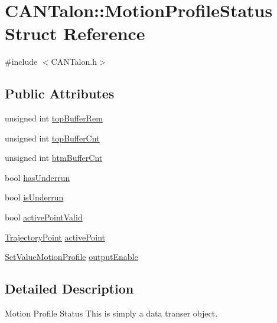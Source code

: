 \hypertarget{struct_c_a_n_talon_1_1_motion_profile_status}{}\section{C\+A\+N\+Talon\+:\+:Motion\+Profile\+Status Struct Reference}
\label{struct_c_a_n_talon_1_1_motion_profile_status}


{\ttfamily \#include $<$C\+A\+N\+Talon.\+h$>$}

\subsection*{Public Attributes}
\begin{DoxyCompactItemize}
\item 
unsigned int \hyperlink{struct_c_a_n_talon_1_1_motion_profile_status_a1042c720d455cede10218449f64946fa}{top\+Buffer\+Rem}
\item 
unsigned int \hyperlink{struct_c_a_n_talon_1_1_motion_profile_status_a9db6e4d8f570c2dba27269c98418ba41}{top\+Buffer\+Cnt}
\item 
unsigned int \hyperlink{struct_c_a_n_talon_1_1_motion_profile_status_a597c83906bfbab8fe0cfbe37146a3741}{btm\+Buffer\+Cnt}
\item 
bool \hyperlink{struct_c_a_n_talon_1_1_motion_profile_status_a5ec97fa0ef5505369b81103069fc2784}{has\+Underrun}
\item 
bool \hyperlink{struct_c_a_n_talon_1_1_motion_profile_status_a2c55098ce3a4f09150ce4434e799d642}{is\+Underrun}
\item 
bool \hyperlink{struct_c_a_n_talon_1_1_motion_profile_status_ad6af70d14a610a0392186f19c52f036b}{active\+Point\+Valid}
\item 
\hyperlink{struct_c_a_n_talon_1_1_trajectory_point}{Trajectory\+Point} \hyperlink{struct_c_a_n_talon_1_1_motion_profile_status_aef26cca61965cb71161eb2df52982c80}{active\+Point}
\item 
\hyperlink{class_c_a_n_talon_a3a5aa35beed1f5d9145dbd658b119b90}{Set\+Value\+Motion\+Profile} \hyperlink{struct_c_a_n_talon_1_1_motion_profile_status_a561e0e418de46f7ef324496d5e8dc6fc}{output\+Enable}
\end{DoxyCompactItemize}


\subsection{Detailed Description}
Motion Profile Status This is simply a data transer object. 

